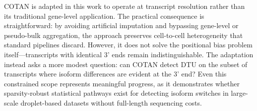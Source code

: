 COTAN is adapted in this work to operate at transcript resolution rather than its traditional gene-level application. The practical consequence is straightforward: by avoiding artificial imputation and bypassing gene-level or pseudo-bulk aggregation, the approach preserves cell-to-cell heterogeneity that standard pipelines discard. However, it does not solve the positional bias problem itself—transcripts with identical 3' ends remain indistinguishable. The adaptation instead asks a more modest question: can COTAN detect DTU on the subset of transcripts where isoform differences are evident at the 3' end? Even this constrained scope represents meaningful progress, as it demonstrates whether sparsity-robust statistical pathways exist for detecting isoform switches in large-scale droplet-based datasets without full-length sequencing costs.
